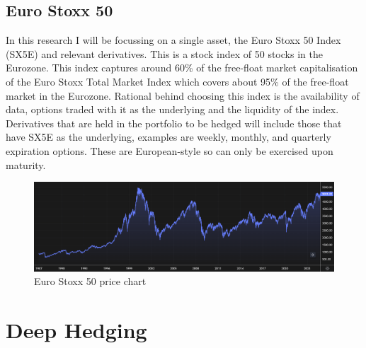 \documentclass[12pt]{article}
\numberwithin{equation}{section}
\begin{document}
\subsection{Euro Stoxx 50}
In this research I will be focussing on a single asset, the Euro Stoxx 50 Index
(SX5E) and relevant derivatives. This is a stock index of 50 stocks in the Eurozone. 
This index captures around 60\% of the free-float market capitalisation of the 
Euro Stoxx Total Market Index which covers about 95\% of the free-float market 
in the Eurozone. Rational behind choosing this index is the availability of data,
options traded with it as the underlying and the liquidity of the index.\\
Derivatives that are held in the portfolio to be hedged will include those that 
have SX5E as the underlying, examples are weekly, monthly, and quarterly
expiration options. These are European-style so can only be exercised upon 
maturity. 
\begin{figure}[h]
    \centering
    \includegraphics[scale=0.35]{sx5e.png}
    \caption{Euro Stoxx 50 price chart}
\end{figure}

\clearpage
\section{Deep Hedging}
\end{document}
